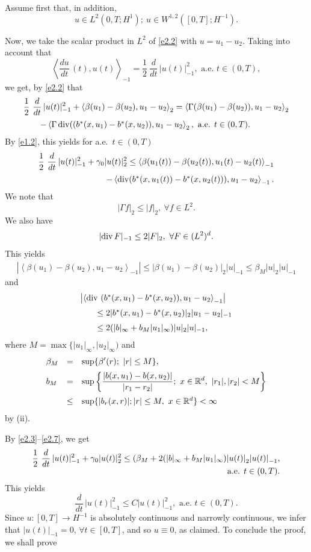 \documentclass[12pt]{article}
\def\rrd{{\rr^d}}
\def\vsp{\vspace*{1,5mm}\\ }
\def\dd{\displaystyle}
\def\barr{\begin{array}}
\def\earr{\end{array}}
\theoremstyle{definition}
\def\vsp{\vspace*{2mm}\\ }
\def\rr{{\mathbb{R}}}
\def\9{{\infty}}
\def\b{{\beta}}
\def\g{{\gamma}}
\def\barr{\begin{array}}
\def\earr{\end{array}}
\def\dd{\displaystyle}
\def\vsp{\vspace*{2mm}\\ }
\def\ff{\forall }
\def\<{\left<}
\def\>{\right>}
\begin{document}
Assume first that, in addition,
\begin{equation}
\label{add-e6}
u\in L^2(0,T;H^1);\ u\in W^{1,2}([0,T];H^{-1}).
\end{equation}


Now, we take the scalar product in $L^2$ of \eqref{e2.2}  with $u=u_1-u_2$. Taking into account that
$$\<\frac{du}{dt}\,(t),u(t)\>_{-1}=\frac12\ \frac d{dt}\,|u(t)|^2_{-1}, \mbox{ a.e. }t\in(0,T),$$we get, by \eqref{e2.2} that
$$\barr{l}
\dd\frac 12\ \frac d{dt}\,|u(t)|^2_{-1}+\<\b(u_1)-\b(u_2),u_1-u_2\>_2
=\<\Gamma(\b(u_1)-\b(u_2)),u_1-u_2\>_2\vsp 
\qquad-\<\Gamma\,{\rm div}((b^*(x,u_1)-b^*(x,u_2)),u_1-u_2\>_2,\ \mbox{a.e. }t\in(0,T).\earr$$ 
By \eqref{e1.2}, this yields for a.e.~$t\in(0,T)$
\begin{equation}
 \label{e2.3}
\barr{r}
\dd\frac12\ \frac d{dt}\,|u(t)|^2_{-1}+\g_0|u(t)|^2_2
\le\<\b(u_1(t))-\b(u_2(t)),u_1(t)-u_2(t)\>_{-1}\vsp
\qquad-\<{\rm div}(b^*(x,u_1(t))-b^*(x,u_2(t))),u_1-u_2\>_{-1}.\earr
\end{equation}
We note that
\begin{equation}
 \label{e2.4}
 |\Gamma f|_2\le|f|_2,\ \ff f\in L^2.
\end{equation}
We also have
\begin{equation}
 \label{e2.5}
|{\rm div}\,F|_{-1}\le2|F|_2,\ \ff F\in (L^2)^d.
\end{equation}This  yields
\begin{equation}
 \label{e2.6}
 \barr{ll}
|\<\b(u_1)-\b(u_2),u_1-u_2\>_{-1}| \le|\b(u_1)-\b(u_2)|_{2}|u|_{-1} 
\le\b_M|u|_2|u|_{-1}
\earr\end{equation}and
\begin{equation}
 \label{e2.7}
\barr{l}
\left|\<{\rm div}\ (b^*(x,u_1)-b^*(x,u_2)),u_1-u_2\>_{-1}\right|\vsp
\qquad\le
2|b^*(x,u_1)-b^*(x,u_2)|_2|u_1-u_2|_{-1}\vsp
\qquad\le2(|b|_\9+b_M|u_1|_\9)|u|_2|u|_{-1},
\earr
\end{equation}
where $M=\max\{|u_1|_\9,|u_2|_\9)$ and
$$\barr{lcl}
\b_M&=&\dd\sup\{\b'(r);\ |r|\le M\},\vsp 
b_M&=&\dd\sup\left\{\frac{|b(x,u_1)-b(x,u_2)|}{|r_1-r_2|};\ x\in\rrd,\ |r_1|,|r_2|<M\right\}\vsp&\le&
\sup\{|b_r(x,r)|;|r|\le M,\ x\in\rrd\} < \infty \earr$$
by (ii).

By \eqref{e2.3}--\eqref{e2.7}, we get
$$\barr{r}
\dd\frac12\ \frac d{dt}\,|u(t)|^2_{-1}+\g_0|u(t)|^2_{2}
\le(\b_M+2(|b|_\9+b_M|u_1|_\9)
|u(t)|^{}_2|u(t)|^{}_{-1},\\\hfill\mbox{a.e. }t\in(0,T).\earr$$
This yields
$$\frac d{dt}\,|u(t)|^2_{-1}\le C|u(t)|^2_{-1},\mbox{ a.e. }t\in(0,T).$$Since $u:[0,T]\to H^{-1}$ is absolutely continuous and narrowly continuous, we infer that $|u(t)|_{-1}=0$, $\ff t\in[0,T]$, and so $u\equiv0$, as claimed.
To conclude the proof, we shall prove
\end{document}
